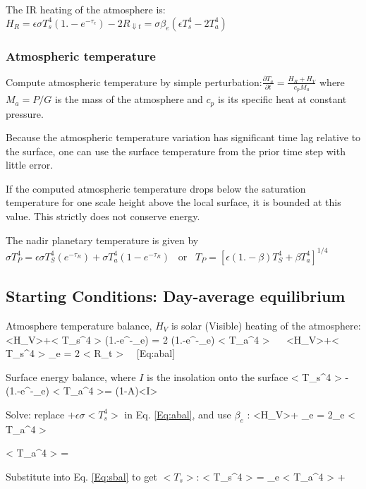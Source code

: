 The IR heating of the atmosphere is: 
$H_R = \epsilon \sigma T_s^4 (1.-e^{-\tau_e}) -2R_{\Downarrow t}
   = \sigma \beta_e (\epsilon T_s^4-2 T_a^4)$

\subsubsection{Atmospheric temperature}

Compute atmospheric temperature by simple perturbation:$ \frac{ \partial
  T_a}{\partial t} = \frac{H_R+H_V}{c_p M_a} $ where $M_a=P/G$ is the mass of the
atmosphere and $c_p$ is its specific heat at constant pressure.  

Because the atmospheric temperature variation has significant time lag relative
to the surface, one can use the surface temperature from the prior time step
with little error.

If the computed atmospheric temperature drops below the \qcc saturation temperature
for one scale height above the local surface, it is bounded at this value. This
strictly does not conserve energy.

The nadir planetary temperature is given by $\sigma T_P^4 = \epsilon \sigma
T_S^4 (e^{-\tau_R}) + \sigma T_a^4 (1-e^{-\tau_R})$ \ or \ 
$T_P = \left[ \epsilon (1.-\beta) T_S^4 +  \beta T_a^4 \right]^{1/4}$ 

\subsection{Starting Conditions: Day-average equilibrium}

Atmosphere temperature balance, $H_V$ is solar (Visible) heating of the atmosphere:
\qbn <H_V>+\epsilon \sigma < T_s^4 > (1.-e^{-\tau_e}) = 2 (1.-e^{-\tau_e})
  \sigma < T_a^4 > \ \mathrm{or} \   <H_V>+\epsilon \sigma < T_s^4 > \beta_e = 2 <  R_{\Downarrow t} > \ \ [Eq:abal] \label{Eq:abal} \qen

Surface energy balance, where $I$ is the insolation onto the surface
\qbn \epsilon \sigma < T_s^4 > -  \epsilon \sigma (1.-e^{-\tau_e}) < T_a^4 >=
(1-A)<I>  \label{Eq:sbal} \qen

Solve: replace $+\epsilon \sigma <T_s^4> $ in Eq. \ref{Eq:abal}, and use $
\beta_e$ :
\qbn <H_V>+ \beta_e  = 2\beta_e  \sigma < T_a^4 > \qen

\qbn < T_a^4 > =  \qen

Substitute into Eq. \ref{Eq:sbal} to get $<T_s>$:
\qbn < T_s^4 > =  \beta_e < T_a^4 > +   \qen

